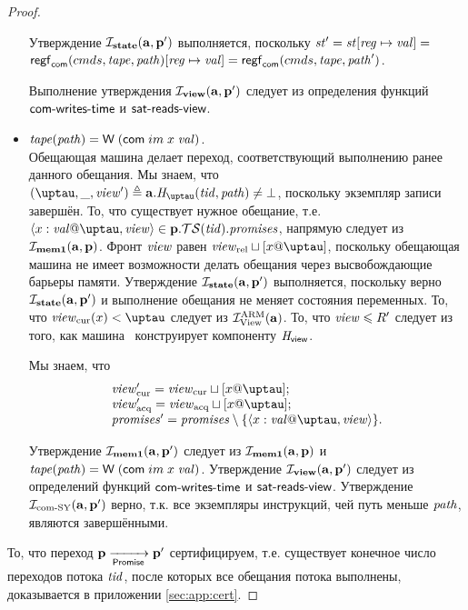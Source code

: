 \begin{proof}
\begin{itemize}
  Утверждение $\mathcal{I}_{\rm \bf state}(\mathbf{a}, \mathbf{p}')$ выполняется, поскольку
  $\mathit{st}' = \mathit{st}[\mathit{reg} \mapsto \mathit{val}] =$
  $\mathsf{regf}_\mathsf{com}({cmds}, \mathit{tape}, \mathit{path})[\mathit{reg} \mapsto \mathit{val}] = \mathsf{regf}_\mathsf{com}({cmds}, \mathit{tape}, \mathit{path}')$.
  
  Выполнение утверждения $\mathcal{I}_{\rm \bf view} (\mathbf{a}, \mathbf{p}')$ следует из определения функций $\textsf{com-writes-time}$ и $\textsf{sat-reads-view}$.

  \item $\mathit{tape}(\mathit{path}) = \textsf{W} \; (\mathsf{com} \; im \; x \; \mathit{val})$. \\
    Обещающая машина делает переход, соответствующий выполнению ранее данного обещания.
    Мы знаем, что $(\tau, \_, \R') \triangleq \aT.\tmap(\tId, \cpath) \not = \bot$,
    поскольку экземпляр записи завершён.
    То, что существует нужное обещание, т.е. $\writeEvt{x}{\stval}{\tau}{\R} \in \p.\TSfprom(\tId).\PromSet$,
    напрямую следует из $\mathcal{I}_{\rm \bf mem1}(\mathbf{a}, \mathbf{p})$.
    Фронт $\mathit{view}$ равен $\Rrel \sqcup [x@\tau]$, поскольку обещающая машина не имеет возможности
    делать обещания через высвобождающие барьеры памяти.
    Утверждение $\mathcal{I}_{\rm \bf state}(\mathbf{a}, \mathbf{p}')$ выполняется, поскольку верно $\mathcal{I}_{\rm \bf state}(\mathbf{a}, \mathbf{p}')$ и выполнение обещания
    не меняет состояния переменных.
    То, что $\Rcur(x) < \tau$ следует из $\mathcal{I}^\text{ARM}_{\textup{\rm {View}}}(\mathbf{a})$.
    То, что $\mathit{view} \leqslant R'$ следует из того, как машина \ARMt~конструирует компоненту $\mathit{H}_{\mathsf{view}}$.

    Мы знаем, что 
    \[\begin{array}{l}
\Rcur' = \Rcur \sqcup [x@\tau];\\
\Racq' = \Racq \sqcup [x@\tau];\\
\PromSet' = \PromSet \setminus \{ \writeEvt{x}{\stval}{\tau}{\R} \}.\\
    \end{array}\]

    Утверждение $\mathcal{I}_{\rm \bf mem1}(\mathbf{a}, \mathbf{p}')$ следует из $\mathcal{I}_{\rm \bf mem1}(\mathbf{a}, \mathbf{p})$ и
    $\mathit{tape}(\mathit{path}) = \textsf{W} \; (\mathsf{com} \; im \; x \; \mathit{val})$.
    Утверждение $\mathcal{I}_{\rm \bf view} (\mathbf{a}, \mathbf{p}')$ следует из определений функций $\textsf{com-writes-time}$ и $\textsf{sat-reads-view}$.
    Утверждение $\mathcal{I}_{\textup{\rm com-SY}}(\mathbf{a}, \mathbf{p}')$ верно, т.к. все экземпляры инструкций, чей путь меньше $\mathit{path}$,
    являются завершёнными.
  \end{itemize}

То, что переход $\mathbf{p} \xrightarrow[\mathsf{Promise}]{} \mathbf{p}'$ сертифицируем, т.е. существует
конечное число переходов потока $\mathit{tid}$, после которых все обещания потока выполнены,
доказывается в приложении \ref{sec:app:cert}.
\end{proof}

